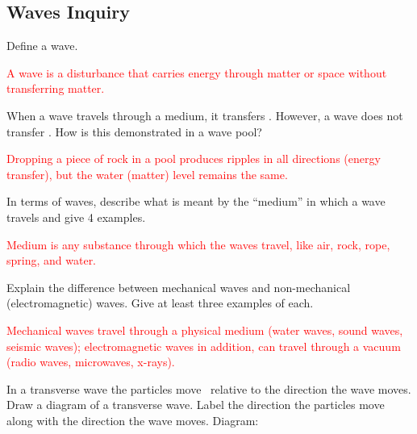 \documentclass[]{exam}
\begin{document}
\subsection*{Waves Inquiry}

\begin{questions}
\question 
Define a wave.

\ifprintanswers
\textcolor{red}{A wave is a disturbance that carries energy through matter or space without transferring matter.}
\else
\fillwithlines{14mm}
\fi

\question 
When a wave travels through a medium, it transfers \fillin[energy][4cm]. However, a wave does not transfer \fillin[matter][4cm]. How is this demonstrated in a wave pool?

\ifprintanswers
\textcolor{red}{Dropping a piece of rock in a pool produces ripples in all directions (energy transfer), but the water (matter) level remains the same.}
\else
\fillwithlines{14mm}
\fi


\question 
In terms of waves, describe what is meant by the ``medium'' in which a wave travels and give 4 examples.

\ifprintanswers
\textcolor{red}{Medium is any substance through which the waves travel, like air, rock, rope, spring, and water.}
\else
\fillwithlines{14mm}
\fi

\question 
Explain the difference between mechanical waves and non-mechanical (electromagnetic) waves. Give at least three examples of each.

\ifprintanswers
\textcolor{red}{Mechanical waves travel through a physical medium (water waves, sound waves, seismic waves); electromagnetic waves in addition, can travel through a vacuum (radio waves, microwaves, x-rays).}
\else
\fillwithlines{21mm}
\fi

\question 
In a transverse wave the particles move \fillin[perpendicular][4cm]\  relative to the direction the wave moves. Draw a diagram of a transverse wave. Label the direction the particles move along with the direction the wave moves. Diagram:


\begin{solutionorbox}[3cm]
\begin{center}
\end{center}
\end{solutionorbox}





\end{questions}
\end{document}
